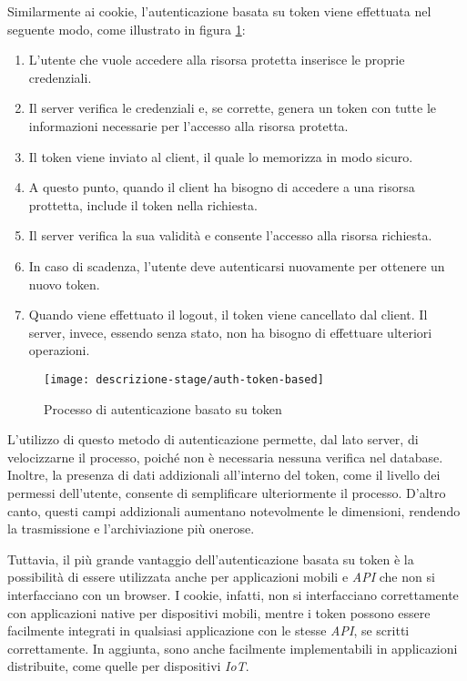 \noindent Similarmente ai cookie, l'autenticazione basata su token viene effettuata nel seguente modo, come illustrato in figura \ref{fig:auth-token-based}:
\begin{enumerate}
	\item L'utente che vuole accedere alla risorsa protetta inserisce le proprie credenziali.
	\item Il server verifica le credenziali e, se corrette, genera un token con tutte le informazioni necessarie per l'accesso alla risorsa protetta.
	\item Il token viene inviato al client, il quale lo memorizza in modo sicuro.
	\item A questo punto, quando il client ha bisogno di accedere a una risorsa prottetta, include il token nella richiesta.
	\item Il server verifica la sua validità e consente l'accesso alla risorsa richiesta. 
	\item In caso di scadenza, l'utente deve autenticarsi nuovamente per ottenere un nuovo token.
	\item Quando viene effettuato il logout, il token viene cancellato dal client. Il server, invece, essendo senza stato, non ha bisogno di effettuare ulteriori operazioni.
\end{enumerate}

\begin{figure}[!ht] 
	\centering 
	\texttt{[image: descrizione-stage/auth-token-based]} 
	\caption{Processo di autenticazione basato su token}
	\label{fig:auth-token-based}
\end{figure}

\noindent L'utilizzo di questo metodo di autenticazione permette, dal lato server, di velocizzarne il processo, poiché non è necessaria nessuna verifica nel database.
Inoltre, la presenza di dati addizionali all'interno del token, come il livello dei permessi dell'utente, consente di semplificare ulteriormente il processo.
D'altro canto, questi campi addizionali aumentano notevolmente le dimensioni, rendendo la trasmissione e l'archiviazione più onerose.

Tuttavia, il più grande vantaggio dell'autenticazione basata su token è la possibilità di essere utilizzata anche per applicazioni mobili e \emph{API} che non si interfacciano con un browser.
I cookie, infatti, non si interfacciano correttamente con applicazioni native per dispositivi mobili, mentre i token possono essere facilmente integrati in qualsiasi applicazione con le stesse \emph{API}, se scritti correttamente.
In aggiunta, sono anche facilmente implementabili in applicazioni distribuite, come quelle per dispositivi \emph{IoT}.\\

